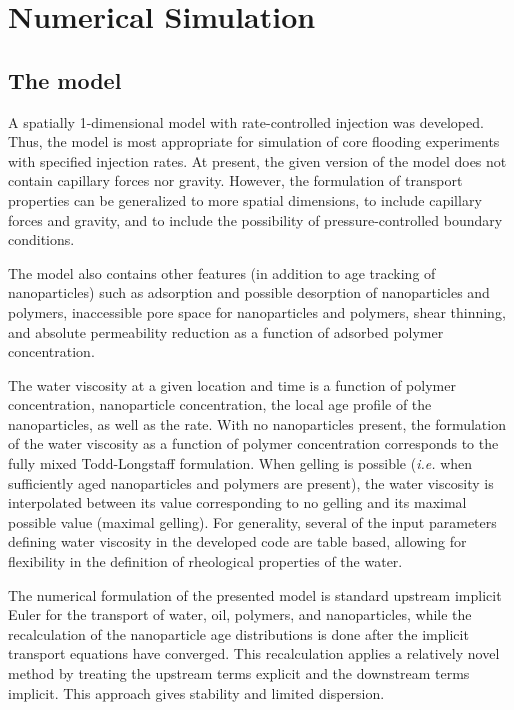\documentclass[nanomaterials,article,submit,moreauthors,pdftex]{Definitions/mdpi}
\begin{document}
\section{Numerical Simulation}
\subsection{The model}
A spatially 1-dimensional model with rate-controlled injection was developed. Thus, the model is most appropriate for simulation of core flooding experiments with specified injection rates. At present, the given version of the model does not contain capillary forces nor gravity. However, the formulation of transport properties can be generalized to more spatial dimensions, to include capillary forces and gravity, and to include the possibility of pressure-controlled boundary conditions. 

The model also contains other features (in addition to age tracking of nanoparticles) such as adsorption and possible desorption of nanoparticles and polymers, inaccessible pore space for nanoparticles and polymers, shear thinning, and absolute permeability reduction as a function of adsorbed polymer concentration. 

The water viscosity at a given location and time is a function of polymer concentration, nanoparticle concentration, the local age profile of the nanoparticles, as well as the rate. With no nanoparticles present, the formulation of the water viscosity as a function of polymer concentration corresponds to the fully mixed Todd-Longstaff formulation. When gelling is possible (\textit{i.e.} when sufficiently aged nanoparticles and polymers are present), the water viscosity is interpolated between its value corresponding to no gelling and its maximal possible value (maximal gelling).  For generality, several of the input parameters defining water viscosity in the developed code are table based, allowing for flexibility in the definition of rheological properties of the water.

The numerical formulation of the presented model is standard upstream implicit Euler for the transport of water, oil, polymers, and nanoparticles, while the recalculation of the nanoparticle age distributions is done after the implicit transport equations have converged. This recalculation applies a relatively novel method \citep{Flatten2008} by treating the upstream terms explicit and the downstream terms implicit. This approach gives stability and limited dispersion. 
\end{document}
